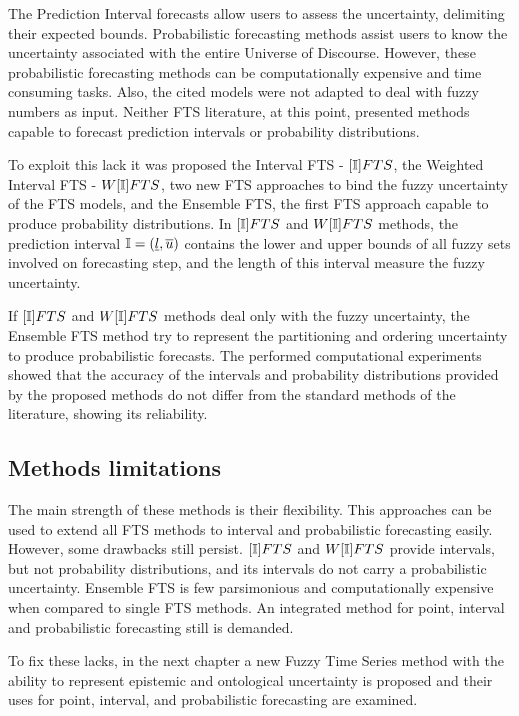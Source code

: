 The Prediction Interval forecasts allow users to assess the uncertainty, delimiting their expected bounds. Probabilistic forecasting methods assist users to know the uncertainty associated with the entire Universe of Discourse. However, these probabilistic forecasting methods can be computationally expensive and time consuming tasks. Also, the cited models were not adapted to deal with fuzzy numbers as input. Neither FTS literature, at this point, presented methods capable to forecast prediction intervals or probability distributions.

To exploit this lack it was proposed the Interval FTS - $[\mathbb{I}]FTS$, the Weighted Interval FTS - $W[\mathbb{I}]FTS$, two new FTS approaches to bind the fuzzy uncertainty of the FTS models, and the Ensemble FTS, the first FTS approach capable to produce probability distributions. In $[\mathbb{I}]FTS$ and $W[\mathbb{I}]FTS$ methods, the prediction interval $\mathbb{I} = (\underline{l},\overline{u})$ contains the lower and upper bounds of all fuzzy sets involved on forecasting step, and the length of this interval measure the fuzzy uncertainty.

If $[\mathbb{I}]FTS$ and $W[\mathbb{I}]FTS$ methods deal only with the fuzzy uncertainty, the Ensemble FTS method try to represent the partitioning and ordering uncertainty to produce probabilistic forecasts. The performed computational experiments showed that the accuracy of the intervals and probability distributions provided by the proposed methods do not differ from the standard methods of the literature, showing its reliability.

\subsection{Methods limitations}

The main strength of these methods is their flexibility. This approaches can be used to extend all FTS methods to interval and probabilistic forecasting easily. However, some drawbacks still persist.  $[\mathbb{I}]FTS$ and $W[\mathbb{I}]FTS$ provide intervals, but not probability distributions, and its intervals do not carry a probabilistic uncertainty. Ensemble FTS is few parsimonious and computationally expensive when compared to single FTS methods. An integrated method for point, interval and probabilistic forecasting still is demanded. 

To fix these lacks, in the next chapter a new Fuzzy Time Series method with the ability to  represent epistemic and ontological uncertainty is proposed and their uses for point, interval, and probabilistic forecasting are examined.

